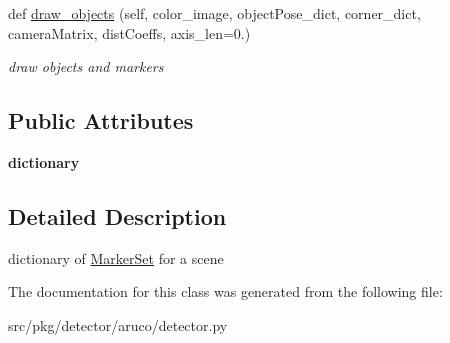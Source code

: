 \begin{DoxyCompactItemize}
\mbox{\label{classrnb-planning_1_1src_1_1pkg_1_1detector_1_1aruco_1_1detector_1_1_aruco_map_a4c70570db6c09870de35e334b4eb53eb}} 
def \hyperlink{classrnb-planning_1_1src_1_1pkg_1_1detector_1_1aruco_1_1detector_1_1_aruco_map_a4c70570db6c09870de35e334b4eb53eb}{draw\+\_\+objects} (self, color\+\_\+image, object\+Pose\+\_\+dict, corner\+\_\+dict, camera\+Matrix, dist\+Coeffs, axis\+\_\+len=0.)
\begin{DoxyCompactList}\small\item\em draw objects and markers \end{DoxyCompactList}\end{DoxyCompactItemize}
\subsection*{Public Attributes}
\begin{DoxyCompactItemize}
\item 
\mbox{\label{classrnb-planning_1_1src_1_1pkg_1_1detector_1_1aruco_1_1detector_1_1_aruco_map_a25a0473e63533b8345cf7b6c8e3d488b}} 
{\bfseries dictionary}
\end{DoxyCompactItemize}


\subsection{Detailed Description}
dictionary of \hyperlink{classrnb-planning_1_1src_1_1pkg_1_1detector_1_1aruco_1_1detector_1_1_marker_set}{Marker\+Set} for a scene 

The documentation for this class was generated from the following file\+:\begin{DoxyCompactItemize}
\item 
src/pkg/detector/aruco/detector.\+py\end{DoxyCompactItemize}
